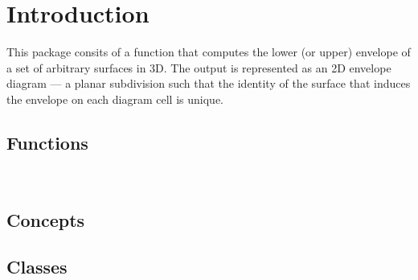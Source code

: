 \section*{Introduction}
\label{mink_ref_sec:intro}

This package consits of a function that computes the lower (or upper)
envelope of a set of arbitrary surfaces in 3D. The output is
represented as an 2D envelope diagram --- a planar subdivision such
that the identity of the surface that induces the envelope on each
diagram cell is unique.

\subsection*{Functions}

\\

\subsection*{Concepts}


\subsection*{Classes}

\\
\\
\\
\\


